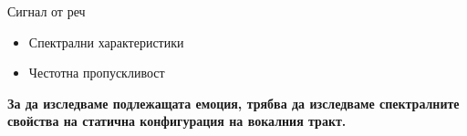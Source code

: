 \documentclass[9pt]{beamer}
\begin{document}
    \begin{frame}{Сигнал от реч}
        \begin{itemize}
            \item Спектрални характеристики
            \pause
            \item Честотна пропускливост
        \end{itemize}
        \pause
        \pause
        \textbf{За да изследваме подлежащата емоция, трябва да изследваме спектралните свойства на статична конфигурация на вокалния тракт.}
    \end{frame}
\end{document}
